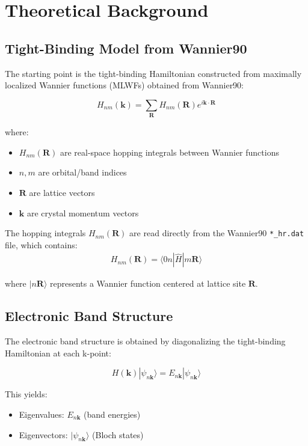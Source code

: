 \documentclass[11pt,a4paper]{article}
\newcommand{\code}[1]{\texttt{#1}}
\newcommand{\ket}[1]{|#1\rangle}
\newcommand{\braket}[2]{\langle #1|#2\rangle}
\begin{document}
\section{Theoretical Background}

\subsection{Tight-Binding Model from Wannier90}

The starting point is the tight-binding Hamiltonian constructed from maximally localized Wannier functions (MLWFs) obtained from Wannier90:

\begin{equation}
H_{nm}(\mathbf{k}) = \sum_{\mathbf{R}} H_{nm}(\mathbf{R}) e^{i\mathbf{k} \cdot \mathbf{R}}
\end{equation}

where:
\begin{itemize}
    \item $H_{nm}(\mathbf{R})$ are real-space hopping integrals between Wannier functions
    \item $n,m$ are orbital/band indices
    \item $\mathbf{R}$ are lattice vectors
    \item $\mathbf{k}$ are crystal momentum vectors
\end{itemize}

The hopping integrals $H_{nm}(\mathbf{R})$ are read directly from the Wannier90 \code{*\_hr.dat} file, which contains:
\begin{align}
H_{nm}(\mathbf{R}) = \braket{0n}{\hat{H}|m\mathbf{R}}
\end{align}

where $\ket{n\mathbf{R}}$ represents a Wannier function centered at lattice site $\mathbf{R}$.

\subsection{Electronic Band Structure}

The electronic band structure is obtained by diagonalizing the tight-binding Hamiltonian at each k-point:

\begin{equation}
H(\mathbf{k}) \ket{\psi_{n\mathbf{k}}} = E_{n\mathbf{k}} \ket{\psi_{n\mathbf{k}}}
\end{equation}

This yields:
\begin{itemize}
    \item Eigenvalues: $E_{n\mathbf{k}}$ (band energies)
    \item Eigenvectors: $\ket{\psi_{n\mathbf{k}}}$ (Bloch states)
\end{itemize}
\end{document}
